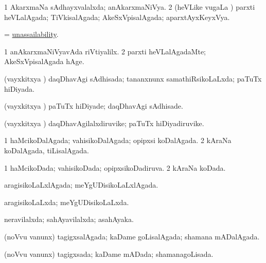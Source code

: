 \bentry
{} 
\gl{\gu}
\expl{}
\bmng
\bnum
\num{1} AkarxmaNa sAdhayxvalalxda; anAkarxmaNiVya. 
\num{2} (heVLike \mo vugaLa \vi) parxti heVLalAgada; TiVkisalAgada; AkeSxVpisalAgada; aparxtAyxKeyxVya. 
\enum
\emng
\eentry

\bentry
{} 
\gl{\nA}
\expl{}
\bmng
= \hyperlink{unassailability}{unassailability}. 
\emng
\eentry

\bentry
{} 
\gl{\kirxvi}
\expl{}
\bmng
\bnum
\num{1} anAkarxmaNiVyavAda riVtiyalilx. 
\num{2} parxti heVLalAgadaMte; AkeSxVpisalAgada hAge. 
\enum
\emng
\eentry

\bentry
{} 
\gl{\gu}
\expl{}
\bmng
(vayxkitxya \vi) daqDhavAgi sAdhisada; tananxnunx samathiRsikoLaLxda; paTuTx hiDiyada. 
\emng
\eentry

\bentry
{} 
\gl{\kirxvi}
\expl{}
\bmng
(vayxkitxya \vi) paTuTx hiDiyade; daqDhavAgi sAdhisade. 
\emng
\eentry

\bentry
{} 
\gl{\nA}
\expl{}
\bmng
(vayxkitxya \vi) daqDhavAgilalxdiruvike; paTuTx hiDiyadiruvike. 
\emng
\eentry

\bentry
{} 
\gl{\gu}
\expl{}
\bmng
\bnum
\num{1} haMcikoDalAgada; vahisikoDalAgada; opipxsi koDalAgada. 
\num{2} kAraNa koDalAgada, tiLisalAgada. 
\enum
\emng
\eentry

\bentry
{} 
\gl{\gu}
\expl{}
\bmng
\bnum
\num{1} haMcikoDada; vahisikoDada; opipxsikoDadiruva. 
\num{2} kAraNa koDada. 
\enum
\emng
\eentry

\bentry
{} 
\gl{\gu}
\expl{}
\bmng
aragisikoLaLxlAgada; meYgUDisikoLaLxlAgada. 
\emng
\eentry

\bentry
{} 
\gl{\gu}
\expl{}
\bmng
aragisikoLaLxda; meYgUDisikoLaLxda. 
\emng
\eentry

\bentry
{} 
\gl{\gu}
\expl{}
\bmng
neravilalxda; sahAyavilalxda; asahAyaka. 
\emng
\eentry

\bentry
{} 
\gl{\gu}
\expl{}
\bmng
(noVvu \mo vanunx) tagigxsalAgada; kaDame goLisalAgada; shamana mADalAgada. 
\emng
\eentry

\bentry
{} 
\gl{\gu}
\expl{}
\bmng
(noVvu \mo vanunx) tagigxsada; kaDame mADada; shamanagoLisada. 
\emng
\eentry

